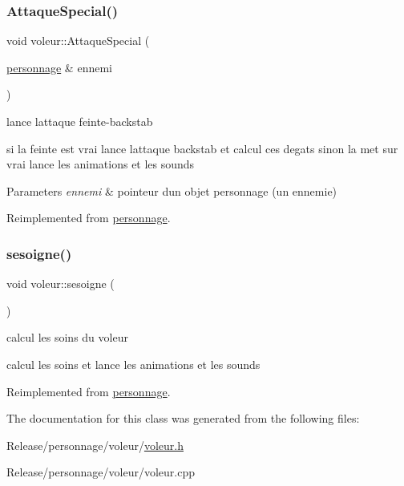 \subsubsection{\texorpdfstring{Attaque\+Special()}{AttaqueSpecial()}}
{\footnotesize\ttfamily void voleur\+::\+Attaque\+Special (\begin{DoxyParamCaption}\item[{\mbox{\hyperlink{classpersonnage}{personnage}} \&}]{ennemi }\end{DoxyParamCaption})\hspace{0.3cm}{\ttfamily [virtual]}}



lance l\textquotesingle{}attaque feinte-\/backstab 

si la feinte est vrai lance l\textquotesingle{}attaque backstab et calcul ces degats sinon la met sur vrai lance les animations et les sounds


\begin{DoxyParams}{Parameters}
{\em ennemi} & pointeur d\textquotesingle{}un objet personnage (un ennemie) \\
\hline
\end{DoxyParams}


Reimplemented from \mbox{\hyperlink{classpersonnage_ab8f27aff95ffc033fb22d56e549bd415}{personnage}}.

\mbox{\label{classvoleur_a3efa7817c3c2a8c5c025df9e9974c218}} 
\subsubsection{\texorpdfstring{sesoigne()}{sesoigne()}}
{\footnotesize\ttfamily void voleur\+::sesoigne (\begin{DoxyParamCaption}{ }\end{DoxyParamCaption})\hspace{0.3cm}{\ttfamily [virtual]}}



calcul les soins du voleur 

calcul les soins et lance les animations et les sounds 

Reimplemented from \mbox{\hyperlink{classpersonnage_a53539db23cbf909d2c4b025ff2ac2e45}{personnage}}.



The documentation for this class was generated from the following files\+:\begin{DoxyCompactItemize}
\item 
Release/personnage/voleur/\mbox{\hyperlink{voleur_8h}{voleur.\+h}}\item 
Release/personnage/voleur/voleur.\+cpp\end{DoxyCompactItemize}
